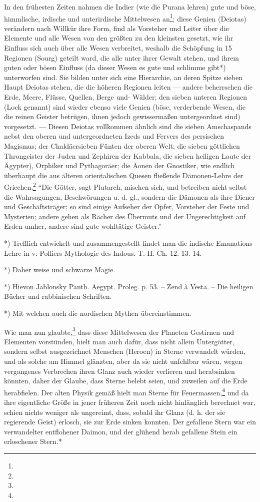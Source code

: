 \documentclass[a4paper, 11pt, oneside, polutonikogreek, german]{article}
\begin{document}
In den frühesten Zeiten nahmen die Indier (wie die Purana lehren) gute und böse, himmlische, irdische und unterirdische Mittelwesen an\footnote{}; diese Genien (Deiotas) verändern nach Willkür ihre Form, find als Vorsteher und Leiter über die Elemente und alle Wesen von den größten zu den kleinsten gesetzt, wie ihr Einfluss sich auch über alle Wesen verbreitet, weshalb die Schöpfung in 15 Regionen (Sourg) geteilt ward, die alle unter ihrer Gewalt stehen, und ihrem guten oder bösen Einfluss (da dieser Wesen es gute und schlimme gibt*) unterworfen sind. Sie bilden unter sich eine Hierarchie, an deren Spitze sieben Haupt Deiotas stehen, die die höheren Regionen leiten --- andere beherrschen die Erde, Meere, Flüsse, Quellen, Berge und- Wälder; den sieben unteren Regionen (Lock genannt) sind wieder ebenso viele Genien (böse, verderbende Wesen, die die reinen Geister betrügen, ihnen jedoch gewissermaßen untergeordnet sind) vorgesetzt. --- Diesen Deiotas vollkommen ähnlich sind die sieben Amschaspands nebst den oberen und untergeordneten Izeds und Fervers des persischen Magismus; der Chaldäersieben Fünten der oberen Welt; die sieben göttlichen Throngeister der Juden und Zephiren der Kabbala, die sieben heiligen Laute der Ägypter), Orphiker und Pythagoräer; die Äonen der Gnostiker, wie endlich überhaupt die aus älteren orientalischen Quesen fließende Dämonen-Lehre der Griechen,\footnote{} "`Die Götter, sagt Plutarch, mischen sich, und betreiben nicht selbst die Wahrsagungen, Beschwörungen u. d. gl., sondern die Dämonen als ihre Diener und Geschäftsträger; so sind einige Aufseher der Opfer, Vorsteher der Feste und Mysterien; andere gehen als Rächer des Übermuts und der Ungerechtigkeit auf Erden umher, andere sind gute wohltätige Geister."'

*) Trefflich entwickelt und zusammengestellt findet man die indische Emanations-Lehre in v. Polliers Mythologie des Indous. T. II. Ch. 12. 13. 14.

*) Daher weise und schwarze Magie.

*) Hievon Jablonsky Panth. Aegypt. Proleg. p. 53. -- Zend à Vesta. -- Die heiligen Bücher und rabbinischen Schriften.

*) Mit welchen auch die nordischen Mythen übereinstimmen.

Wie man nun glaubte,\footnote{} dass diese Mittelwesen der Planeten Gestirnen und Elementen vorstünden, hielt man auch dafür, dass nicht allein Untergötter, sondern selbst ausgezeichnet Menschen (Heroen) in Sterne verwandelt würden, und als solche am Himmel glänzten, aber da sie nicht unfehlbar wären, wegen vergangenes Verbrechen ihren Glanz auch wieder verlieren und herabsinken könnten, daher der Glaube, dass Sterne belebt seien, und zuweilen auf die Erde herabfielen. Der alten Physik gemäß hielt man Sterne für Feuermassen,\footnote{} und da ihre eigentliche Größe in jener früheren Zeit noch nicht hinlänglich berechnet war, schien nichts weniger als ungereimt, dass, sobald ihr Glanz (d. h. der sie regierende Geist) erlosch, sie zur Erde sinken konnten. Der gefallene Stern war ein verwandelter entflohener Daimon, und der glühend herab gefallene Stein ein erloschener Stern.*
\end{document}

